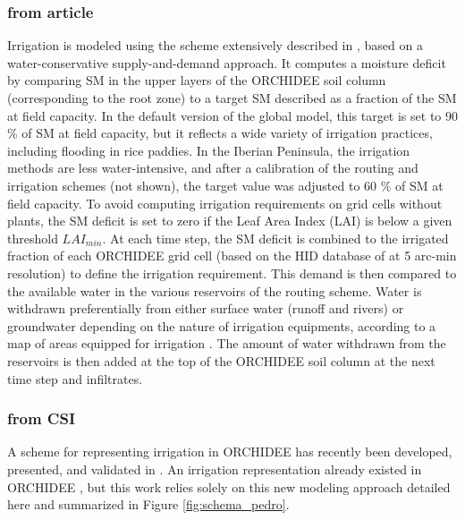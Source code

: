 \subsubsection{from article}
Irrigation is modeled using the scheme extensively described in \citet{arboleda-obando_validation_2024}, based on a water-conservative supply-and-demand approach.
It computes a moisture deficit by comparing SM in the upper layers of the ORCHIDEE soil column (corresponding to the root zone) to a target SM described as a fraction of the SM at field capacity.
In the default version of the global model, this target is set to 90 \% of SM at field capacity, but it reflects a wide variety of irrigation practices, including flooding in rice paddies. In the Iberian Peninsula, the irrigation methods are less water-intensive, and after a calibration of the routing and irrigation schemes (not shown), the target value was adjusted to 60 \% of SM at field capacity. 
To avoid computing irrigation requirements on grid cells without plants, the SM deficit is set to zero if the Leaf Area Index (LAI) is below a given threshold $LAI_{min}$.
At each time step, the SM deficit is combined to the irrigated fraction of each ORCHIDEE grid cell (based on the HID database of \citet{siebert_quantifying_2010} at 5 arc-min resolution) to define the irrigation requirement. 
This demand is then compared to the available water in the various reservoirs of the routing scheme. Water is withdrawn preferentially from either surface water (runoff and rivers) or groundwater depending on the nature of irrigation equipments, according to a map of areas equipped for irrigation \citep{siebert_groundwater_2010}.
The amount of water withdrawn from the reservoirs is then added at the top of the ORCHIDEE soil column at the next time step and infiltrates.

\subsubsection{from CSI}
A scheme for representing irrigation in ORCHIDEE has recently been developed, presented, and validated in \citet{arboleda-obando_validation_2024}. An irrigation representation already existed in ORCHIDEE \citep{de_rosnay_integrated_2003, guimberteau_global_2012}, but this work relies solely on this new modeling approach detailed here and summarized in Figure \ref{fig:schema_pedro}.

